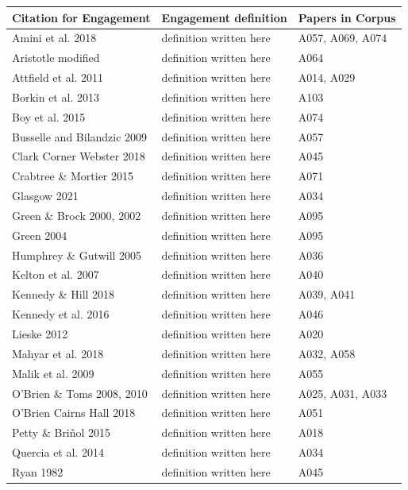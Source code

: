\begin{table}[t]
\centering
\setlength{\tabcolsep}{6pt}
\renewcommand{\arraystretch}{1.15}
\begin{tabular*}{\textwidth}{@{\extracolsep{\fill}} p{} p{} p{} @{} }
\hline
\textbf{Citation for Engagement} & \textbf{Engagement definition} & \textbf{Papers in Corpus} \\
\hline
Amini et al. 2018 & definition written here & A057, A069, A074 \\
Aristotle modified & definition written here & A064 \\
Attfield et al. 2011 & definition written here & A014, A029 \\
Borkin et al. 2013 & definition written here & A103 \\
Boy et al. 2015 & definition written here & A074 \\
Busselle and Bilandzic 2009 & definition written here & A057 \\
Clark Corner Webster 2018 & definition written here & A045 \\
Crabtree \& Mortier 2015 & definition written here & A071 \\
Glasgow 2021 & definition written here & A034 \\
Green \& Brock 2000, 2002 & definition written here & A095 \\
Green 2004 & definition written here & A095 \\
Humphrey \& Gutwill 2005 & definition written here & A036 \\
Kelton et al. 2007 & definition written here & A040 \\
Kennedy \& Hill 2018 & definition written here & A039, A041 \\
Kennedy et al. 2016 & definition written here & A046 \\
Lieske 2012 & definition written here & A020 \\
Mahyar et al. 2018 & definition written here & A032, A058 \\
Malik et al. 2009 & definition written here & A055 \\
O'Brien \& Toms 2008, 2010 & definition written here & A025, A031, A033 \\
O'Brien Cairns Hall 2018 & definition written here & A051 \\
Petty \& Briñol 2015 & definition written here & A018 \\
Quercia et al. 2014 & definition written here & A034 \\
Ryan 1982 & definition written here & A045 \\

\end{tabular*}
\end{table}
